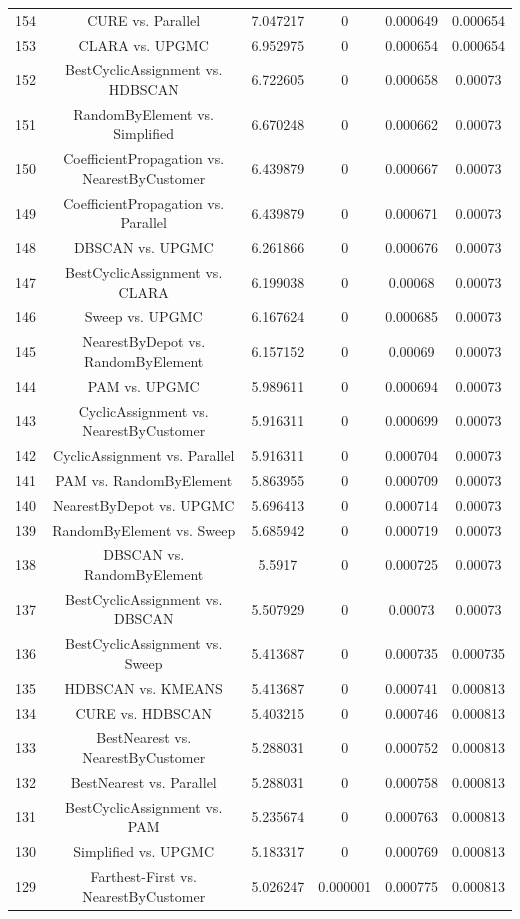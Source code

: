 \documentclass[a4paper,10pt]{article}
\begin{document}
\begin{landscape}
\begin{table}[!htp]
\begin{tabular}{cccccc}
154&CURE vs. Parallel&7.047217&0&0.000649&0.000654\\
153&CLARA vs. UPGMC&6.952975&0&0.000654&0.000654\\
152&BestCyclicAssignment vs. HDBSCAN&6.722605&0&0.000658&0.00073\\
151&RandomByElement vs. Simplified&6.670248&0&0.000662&0.00073\\
150&CoefficientPropagation vs. NearestByCustomer&6.439879&0&0.000667&0.00073\\
149&CoefficientPropagation vs. Parallel&6.439879&0&0.000671&0.00073\\
148&DBSCAN vs. UPGMC&6.261866&0&0.000676&0.00073\\
147&BestCyclicAssignment vs. CLARA&6.199038&0&0.00068&0.00073\\
146&Sweep vs. UPGMC&6.167624&0&0.000685&0.00073\\
145&NearestByDepot vs. RandomByElement&6.157152&0&0.00069&0.00073\\
144&PAM vs. UPGMC&5.989611&0&0.000694&0.00073\\
143&CyclicAssignment vs. NearestByCustomer&5.916311&0&0.000699&0.00073\\
142&CyclicAssignment vs. Parallel&5.916311&0&0.000704&0.00073\\
141&PAM vs. RandomByElement&5.863955&0&0.000709&0.00073\\
140&NearestByDepot vs. UPGMC&5.696413&0&0.000714&0.00073\\
139&RandomByElement vs. Sweep&5.685942&0&0.000719&0.00073\\
138&DBSCAN vs. RandomByElement&5.5917&0&0.000725&0.00073\\
137&BestCyclicAssignment vs. DBSCAN&5.507929&0&0.00073&0.00073\\
136&BestCyclicAssignment vs. Sweep&5.413687&0&0.000735&0.000735\\
135&HDBSCAN vs. KMEANS&5.413687&0&0.000741&0.000813\\
134&CURE vs. HDBSCAN&5.403215&0&0.000746&0.000813\\
133&BestNearest vs. NearestByCustomer&5.288031&0&0.000752&0.000813\\
132&BestNearest vs. Parallel&5.288031&0&0.000758&0.000813\\
131&BestCyclicAssignment vs. PAM&5.235674&0&0.000763&0.000813\\
130&Simplified vs. UPGMC&5.183317&0&0.000769&0.000813\\
129&Farthest-First vs. NearestByCustomer&5.026247&0.000001&0.000775&0.000813\\

\end{tabular}
\end{table}
\end{landscape}
\end{document}
